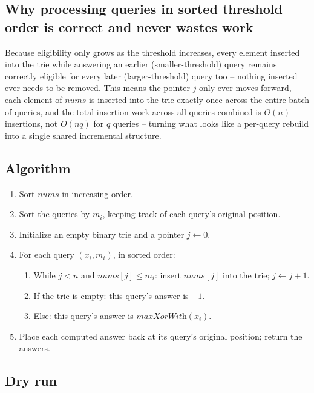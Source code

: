 \subsection*{Why processing queries in sorted threshold order is correct and never wastes work}

Because eligibility only grows as the threshold increases, every element
inserted into the trie while answering an earlier (smaller-threshold)
query remains correctly eligible for every later (larger-threshold)
query too -- nothing inserted ever needs to be removed. This means the
pointer $j$ only ever moves forward, each element of $\textit{nums}$ is
inserted into the trie exactly once across the entire batch of queries,
and the total insertion work across all queries combined is $O(n)$
insertions, not $O(nq)$ for $q$ queries -- turning what looks like a
per-query rebuild into a single shared incremental structure.

\subsection*{Algorithm}

\begin{enumerate}
  \item Sort $\textit{nums}$ in increasing order.
  \item Sort the queries by $m_i$, keeping track of each query's
        original position.
  \item Initialize an empty binary trie and a pointer $j \gets 0$.
  \item For each query $(x_i, m_i)$, in sorted order:
  \begin{enumerate}
    \item While $j<n$ and $\textit{nums}[j] \le m_i$: insert
          $\textit{nums}[j]$ into the trie; $j \gets j+1$.
    \item If the trie is empty: this query's answer is $-1$.
    \item Else: this query's answer is
          $\textit{maxXorWith}(x_i)$.
  \end{enumerate}
  \item Place each computed answer back at its query's original
        position; return the answers.
\end{enumerate}

\subsection*{Dry run}

